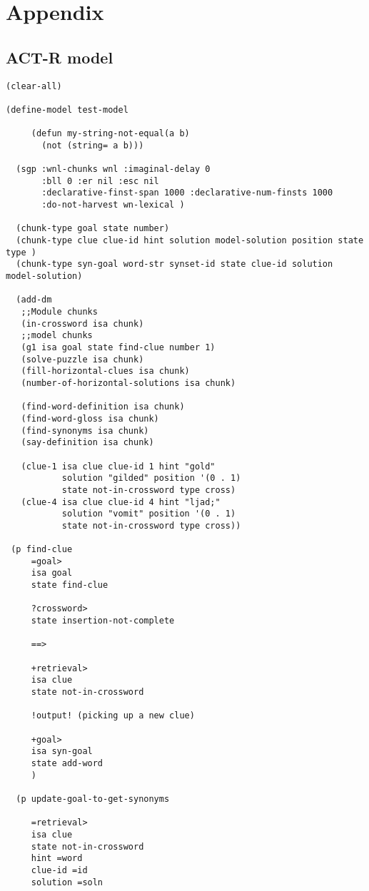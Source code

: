 
\headsep 0.8in
\chapter{Appendix}

\section{ACT-R model}
\begin{verbatim}
(clear-all)

(define-model test-model

     (defun my-string-not-equal(a b)
       (not (string= a b)))

  (sgp :wnl-chunks wnl :imaginal-delay 0 
       :bll 0 :er nil :esc nil 
       :declarative-finst-span 1000 :declarative-num-finsts 1000 
       :do-not-harvest wn-lexical )
    
  (chunk-type goal state number)
  (chunk-type clue clue-id hint solution model-solution position state type )
  (chunk-type syn-goal word-str synset-id state clue-id solution model-solution)
  
  (add-dm
   ;;Module chunks
   (in-crossword isa chunk)
   ;;model chunks
   (g1 isa goal state find-clue number 1)
   (solve-puzzle isa chunk)
   (fill-horizontal-clues isa chunk)
   (number-of-horizontal-solutions isa chunk)

   (find-word-definition isa chunk)
   (find-word-gloss isa chunk)
   (find-synonyms isa chunk)
   (say-definition isa chunk)

   (clue-1 isa clue clue-id 1 hint "gold" 
           solution "gilded" position '(0 . 1) 
           state not-in-crossword type cross)
   (clue-4 isa clue clue-id 4 hint "ljad;" 
           solution "vomit" position '(0 . 1) 
           state not-in-crossword type cross))
 
 (p find-clue
     =goal>
     isa goal
     state find-clue

     ?crossword>
     state insertion-not-complete

     ==>

     +retrieval>
     isa clue
     state not-in-crossword

     !output! (picking up a new clue)

     +goal>
     isa syn-goal
     state add-word
     )

  (p update-goal-to-get-synonyms
     
     =retrieval>
     isa clue
     state not-in-crossword
     hint =word
     clue-id =id
     solution =soln


\end{verbatim}
